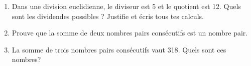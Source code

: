 \begin{enumerate}
          \begin{enumerate}[label=\arabic*)]
            \item Quelle est la taille maximale possible pour les plaques de bois (en
                  nombre entier de cm) ?
            \item Combien de plaques va-t-elle utiliser ?
          \end{enumerate}
    \item Dans une division euclidienne, le diviseur est 5 et le quotient est 12. Quels sont les dividendes possibles ? Justifie et écris tous tes calculs.
    \item Prouve que la somme de deux nombres pairs consécutifs est un nombre pair.
    \item La somme de trois nombres pairs consécutifs vaut 318. Quels sont ces nombres?
  \end{enumerate}

